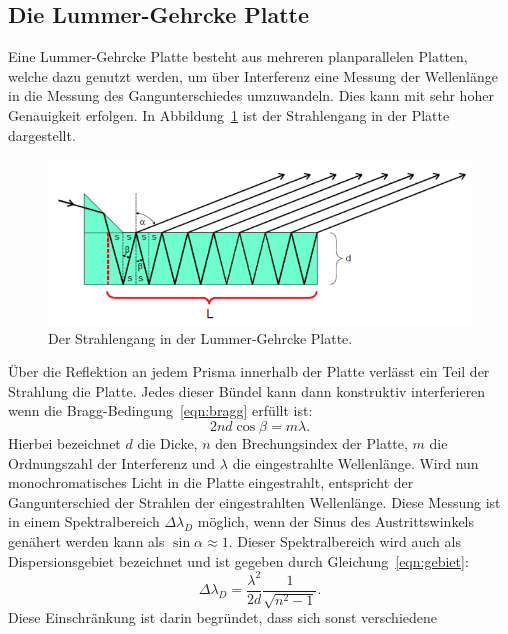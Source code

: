 \subsection{Die Lummer-Gehrcke Platte}
\label{subsec:lummergehrcke}
Eine Lummer-Gehrcke Platte besteht aus mehreren planparallelen Platten, welche
dazu genutzt werden, um über Interferenz eine Messung der Wellenlänge in die
Messung des Gangunterschiedes umzuwandeln. Dies kann mit sehr hoher
Genauigkeit erfolgen. In Abbildung~\ref{fig:lummergehrcke} ist der Strahlengang
in der Platte dargestellt.
\begin{figure}[H]
  \centering
 \includegraphics[scale=0.5]{pictures/lummergehrcke.png}
 \caption{Der Strahlengang in der Lummer-Gehrcke Platte. \cite{Versuchsbeschreibung}}
 \label{fig:lummergehrcke}
\end{figure}
\noindent
Über die Reflektion an jedem Prisma innerhalb der Platte verlässt ein Teil der
Strahlung die Platte. Jedes dieser Bündel kann dann konstruktiv interferieren
wenn die Bragg-Bedingung~\ref{eqn:bragg} erfüllt ist:
\begin{equation}
 2 n d \cos{\beta} = m \lambda.
 \label{eqn:bragg}
\end{equation}
\noindent
Hierbei bezeichnet $d$ die Dicke, $n$ den Brechungsindex der Platte, $m$ die
Ordnungszahl der Interferenz und $\lambda$ die eingestrahlte Wellenlänge. Wird nun
monochromatisches Licht in die Platte eingestrahlt, entspricht der
Gangunterschied der Strahlen der eingestrahlten Wellenlänge. Diese Messung ist
in einem Spektralbereich $\Delta \lambda_{D}$ möglich, wenn der Sinus des Austrittswinkels
genähert werden kann als $\sin{\alpha} \approx 1$. Dieser Spektralbereich wird auch als
Dispersionsgebiet bezeichnet und ist gegeben durch Gleichung~\ref{eqn:gebiet}\cite{Versuchsbeschreibung}:
\begin{equation}
 \Delta \lambda_{D} = \frac{\lambda^{2}}{2d} \frac{1}{\sqrt{n^{2}-1}}.
 \label{eqn:gebiet}
\end{equation}
Diese Einschränkung ist darin begründet, dass sich sonst verschiedene
